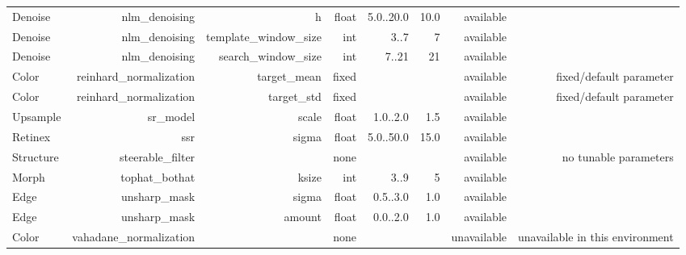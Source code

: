 \begin{tabular}{lrrrrrrr}
Denoise & nlm\_denoising & h & float & 5.0..20.0 & 10.0 & available &  \\
Denoise & nlm\_denoising & template\_window\_size & int & 3..7 & 7 & available &  \\
Denoise & nlm\_denoising & search\_window\_size & int & 7..21 & 21 & available &  \\
Color & reinhard\_normalization & target\_mean & fixed &  &  & available & fixed/default parameter \\
Color & reinhard\_normalization & target\_std & fixed &  &  & available & fixed/default parameter \\
Upsample & sr\_model & scale & float & 1.0..2.0 & 1.5 & available &  \\
Retinex & ssr & sigma & float & 5.0..50.0 & 15.0 & available &  \\
Structure & steerable\_filter &  & none &  &  & available & no tunable parameters \\
Morph & tophat\_bothat & ksize & int & 3..9 & 5 & available &  \\
Edge & unsharp\_mask & sigma & float & 0.5..3.0 & 1.0 & available &  \\
Edge & unsharp\_mask & amount & float & 0.0..2.0 & 1.0 & available &  \\
Color & vahadane\_normalization &  & none &  &  & unavailable & unavailable in this environment \\
\hline
\end{tabular}
